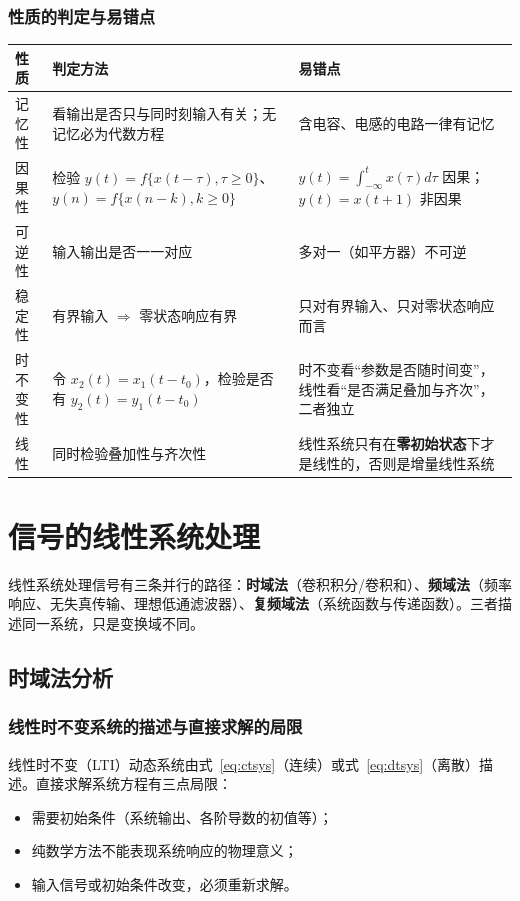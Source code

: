 \subsubsection{性质的判定与易错点}
\begin{center}
\begin{tabular}{p{2.6cm}p{5.2cm}p{5.6cm}}
\toprule
性质 & 判定方法 & 易错点 \\
\midrule
记忆性 & 看输出是否只与同时刻输入有关；无记忆必为代数方程 & 含电容、电感的电路一律有记忆 \\
因果性 & 检验 $y(t)=f\{x(t-\tau),\tau\ge 0\}$、$y(n)=f\{x(n-k),k\ge 0\}$ & $y(t)=\int_{-\infty}^{t}x(\tau)d\tau$ 因果；$y(t)=x(t+1)$ 非因果 \\
可逆性 & 输入输出是否一一对应 & 多对一（如平方器）不可逆 \\
稳定性 & 有界输入 $\Rightarrow$ 零状态响应有界 & 只对有界输入、只对零状态响应而言 \\
时不变性 & 令 $x_2(t)=x_1(t-t_0)$，检验是否有 $y_2(t)=y_1(t-t_0)$ & 时不变看“参数是否随时间变”，线性看“是否满足叠加与齐次”，二者独立 \\
线性 & 同时检验叠加性与齐次性 & 线性系统只有在\textbf{零初始状态}下才是线性的，否则是增量线性系统 \\
\bottomrule
\end{tabular}
\end{center}

\section{信号的线性系统处理}

线性系统处理信号有三条并行的路径：\textbf{时域法}（卷积积分/卷积和）、\textbf{频域法}（频率响应、无失真传输、理想低通滤波器）、\textbf{复频域法}（系统函数与传递函数）。三者描述同一系统，只是变换域不同。

\subsection{时域法分析}

\subsubsection{线性时不变系统的描述与直接求解的局限}
线性时不变（LTI）动态系统由式~\eqref{eq:ctsys}（连续）或式~\eqref{eq:dtsys}（离散）描述。直接求解系统方程有三点局限：
\begin{itemize}
\item 需要初始条件（系统输出、各阶导数的初值等）；
\item 纯数学方法不能表现系统响应的物理意义；
\item 输入信号或初始条件改变，必须重新求解。
\end{itemize}

